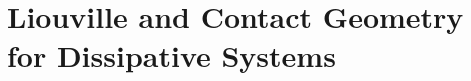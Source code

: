 \chapter{Liouville and Contact Geometry for Dissipative Systems}
\label{chap:contact_mechanics} 
%
%
